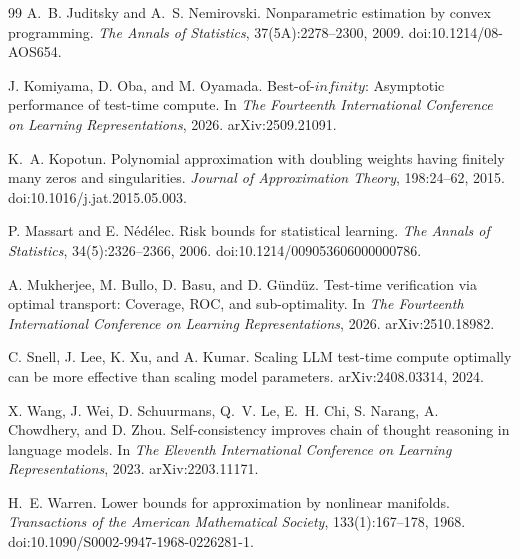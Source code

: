 \documentclass[11pt]{article}
\def\infty{infinity}%
\begin{document}
\begin{thebibliography}{99}
A.~B. Juditsky and A.~S. Nemirovski.
\newblock Nonparametric estimation by convex programming.
\newblock \emph{The Annals of Statistics}, 37(5A):2278--2300, 2009.
\newblock doi:10.1214/08-AOS654.

J. Komiyama, D. Oba, and M. Oyamada.
\newblock Best-of-$\infty$: Asymptotic performance of test-time compute.
\newblock In \emph{The Fourteenth International Conference on Learning Representations}, 2026.
\newblock arXiv:2509.21091.

K.~A. Kopotun.
\newblock Polynomial approximation with doubling weights having finitely many zeros and singularities.
\newblock \emph{Journal of Approximation Theory}, 198:24--62, 2015.
\newblock doi:10.1016/j.jat.2015.05.003.

P. Massart and E. N\'ed\'elec.
\newblock Risk bounds for statistical learning.
\newblock \emph{The Annals of Statistics}, 34(5):2326--2366, 2006.
\newblock doi:10.1214/009053606000000786.

A. Mukherjee, M. Bullo, D. Basu, and D. G\"und\"uz.
\newblock Test-time verification via optimal transport: Coverage, ROC, and sub-optimality.
\newblock In \emph{The Fourteenth International Conference on Learning Representations}, 2026.
\newblock arXiv:2510.18982.

C. Snell, J. Lee, K. Xu, and A. Kumar.
\newblock Scaling LLM test-time compute optimally can be more effective than scaling model parameters.
\newblock arXiv:2408.03314, 2024.

X. Wang, J. Wei, D. Schuurmans, Q.~V. Le, E.~H. Chi, S. Narang, A. Chowdhery, and D. Zhou.
\newblock Self-consistency improves chain of thought reasoning in language models.
\newblock In \emph{The Eleventh International Conference on Learning Representations}, 2023.
\newblock arXiv:2203.11171.

H.~E. Warren.
\newblock Lower bounds for approximation by nonlinear manifolds.
\newblock \emph{Transactions of the American Mathematical Society}, 133(1):167--178, 1968.
\newblock doi:10.1090/S0002-9947-1968-0226281-1.

\end{thebibliography}
\end{document}
